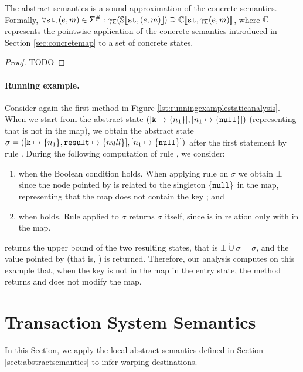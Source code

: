 \begin{lemma}
	The abstract semantics is a sound approximation of the concrete semantics. Formally, $\forall \mathtt{st}, (e, m) \in \mathsf{\Sigma}^\#: \gamma_{\mathsf{\Sigma}}(\mathbb{S}\llbracket \mathtt{st}, (e, m) \rrbracket) \supseteq \mathbb{C}\llbracket \mathtt{st}, \gamma_{\mathsf{\Sigma}}(e, m) \rrbracket$, where $\mathbb{C}$ represents the pointwise application of the concrete semantics introduced in Section \ref{sec:concretemap} to a set of concrete states.
\end{lemma}
\begin{proof}
TODO
\end{proof}

\paragraph{Running example.}
Consider again the first method in Figure \ref{lst:runningexamplestaticanalysis}. When we start from the abstract state  $([\mathtt{k} \mapsto \{n_1\}], [n_1 \mapsto \{\mathtt{null}\}])$ (representing that  is not in the map), we obtain the abstract state $\sigma = ([\mathtt{k} \mapsto \{n_1\}, \mathtt{result} \mapsto \{null\}], [n_1 \mapsto \{\mathtt{null}\}])$ after the first statement by rule . During the following computation of rule , we consider:
\begin{enumerate}
	\item when the Boolean condition  holds. When applying rule  on $\sigma$ we obtain $\bot$ since the node pointed by  is related to the singleton $\{\mathtt{null}\}$ in the map, representing that the map does not contain the key ; and
	\item when  holds. Rule  applied to $\sigma$ returns $\sigma$ itself, since  is in relation only with  in the map.
\end{enumerate}
 returns the upper bound of the two resulting states, that is $\bot \dot{\cup} \sigma = \sigma$, and the value pointed by  (that is, ) is returned.
Therefore, our analysis computes on this example that, when the key is not in the map in the entry state, the method returns  and does not modify the map.


\section{Transaction System Semantics}
\label{sec:transactionsystemwarping}
In this Section, we apply the local abstract semantics defined in Section \ref{sect:abstractsemantics} to infer warping destinations.

